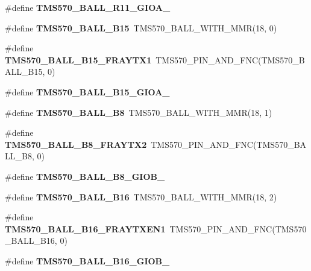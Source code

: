 \begin{DoxyCompactItemize}
\#define {\bfseries T\+M\+S570\+\_\+\+B\+A\+L\+L\+\_\+\+R11\+\_\+\+G\+I\+O\+A\+\_}
\item 
\mbox{\label{tms570lc4357-pins_8h_a08546c30c33fac8565f0dafdb49c638f}} 
\#define {\bfseries T\+M\+S570\+\_\+\+B\+A\+L\+L\+\_\+\+B15}~T\+M\+S570\+\_\+\+B\+A\+L\+L\+\_\+\+W\+I\+T\+H\+\_\+\+M\+MR(18, 0)
\item 
\mbox{\label{tms570lc4357-pins_8h_a6361cb496a489996db02f9772c30c259}} 
\#define {\bfseries T\+M\+S570\+\_\+\+B\+A\+L\+L\+\_\+\+B15\+\_\+\+F\+R\+A\+Y\+T\+X1}~T\+M\+S570\+\_\+\+P\+I\+N\+\_\+\+A\+N\+D\+\_\+\+F\+NC(T\+M\+S570\+\_\+\+B\+A\+L\+L\+\_\+\+B15, 0)
\item 
\#define {\bfseries T\+M\+S570\+\_\+\+B\+A\+L\+L\+\_\+\+B15\+\_\+\+G\+I\+O\+A\+\_}
\item 
\mbox{\label{tms570lc4357-pins_8h_a4f0db801281d43dfc9cf373e170b0610}} 
\#define {\bfseries T\+M\+S570\+\_\+\+B\+A\+L\+L\+\_\+\+B8}~T\+M\+S570\+\_\+\+B\+A\+L\+L\+\_\+\+W\+I\+T\+H\+\_\+\+M\+MR(18, 1)
\item 
\mbox{\label{tms570lc4357-pins_8h_a2d6c3f3dd5773b4f61f562d4538ccece}} 
\#define {\bfseries T\+M\+S570\+\_\+\+B\+A\+L\+L\+\_\+\+B8\+\_\+\+F\+R\+A\+Y\+T\+X2}~T\+M\+S570\+\_\+\+P\+I\+N\+\_\+\+A\+N\+D\+\_\+\+F\+NC(T\+M\+S570\+\_\+\+B\+A\+L\+L\+\_\+\+B8, 0)
\item 
\#define {\bfseries T\+M\+S570\+\_\+\+B\+A\+L\+L\+\_\+\+B8\+\_\+\+G\+I\+O\+B\+\_}
\item 
\mbox{\label{tms570lc4357-pins_8h_a46804d1008aa759fcc25cf68477a600c}} 
\#define {\bfseries T\+M\+S570\+\_\+\+B\+A\+L\+L\+\_\+\+B16}~T\+M\+S570\+\_\+\+B\+A\+L\+L\+\_\+\+W\+I\+T\+H\+\_\+\+M\+MR(18, 2)
\item 
\mbox{\label{tms570lc4357-pins_8h_a90a7d4436e275851db4c12a6064e8b0d}} 
\#define {\bfseries T\+M\+S570\+\_\+\+B\+A\+L\+L\+\_\+\+B16\+\_\+\+F\+R\+A\+Y\+T\+X\+E\+N1}~T\+M\+S570\+\_\+\+P\+I\+N\+\_\+\+A\+N\+D\+\_\+\+F\+NC(T\+M\+S570\+\_\+\+B\+A\+L\+L\+\_\+\+B16, 0)
\item 
\#define {\bfseries T\+M\+S570\+\_\+\+B\+A\+L\+L\+\_\+\+B16\+\_\+\+G\+I\+O\+B\+\_}
\item 
\mbox{\label{tms570lc4357-pins_8h_a3733d7faaa4b0eedcab8c995c8830c01}} 

\end{DoxyCompactItemize}
